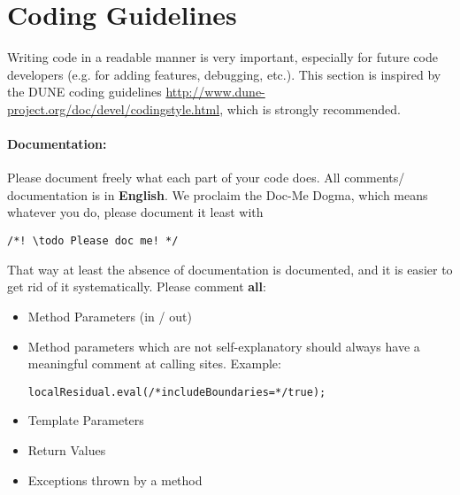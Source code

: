 \section{Coding Guidelines}
\label{sc_guidelines}
Writing code in a readable manner is very important, especially
for future code developers (e.g. for adding features, debugging, etc.).
This section is inspired by the DUNE coding guidelines
\url{http://www.dune-project.org/doc/devel/codingstyle.html}, which is strongly
recommended.

\paragraph{Documentation:}
Please document freely what each part of your code does. All comments/ documentation
is in \textbf{English}.
We proclaim the Doc-Me Dogma, which means whatever you do, please document
it least with
\begin{lstlisting}[style=DumuxCode]
  /*! \todo Please doc me! */
\end{lstlisting}
That way at least the absence of documentation is documented, and it is easier
to get rid of it systematically. Please comment \textbf{all}:
\begin{itemize}
  \item Method Parameters (in / out)
  \item Method parameters which are not self-explanatory should always
        have a meaningful comment at calling sites. Example:
  \begin{lstlisting}[style=DumuxCode]
    localResidual.eval(/*includeBoundaries=*/true);
  \end{lstlisting}
  \item Template Parameters
  \item Return Values
  \item Exceptions thrown by a method
\end{itemize}

